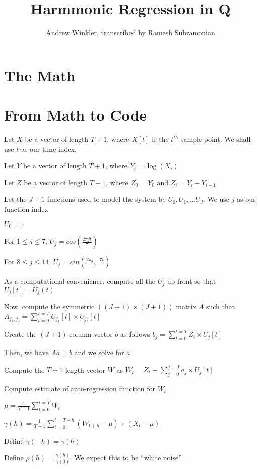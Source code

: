 \documentclass[12pt,timesnewroman,letterpaper]{article}
\begin{document}
\title{Harmmonic Regression in Q}
\author{Andrew Winkler, transcribed by Ramesh Subramonian }
\maketitle
\thispagestyle{fancy}
\cfoot{}
\rfoot{{\small \thepage}}

\section{The Math}
\TBC
\section{From Math to Code}
\bi
\item Let \(X\) be a vector of length \(T+1\), where \(X[t]\) is the \(t^{th}\)
sample point. We shall use \(t\) as our time index.
\item Let \(Y\) be a vector of length \(T+1\), where \(Y_i = \log(X_i)\)
\item Let \(Z\) be a vector of length \(T+1\), where 
\(Z_0 = Y_0\) and 
\(Z_i = Y_i - Y_{i-1}\)
\item 
Let the \(J+1\) functions used to model the system 
be \(U_0, U_1, \ldots U_J\). We use \(j\) as our
function index
\be
\item \(U_0 = 1\)
\item For \(1 \leq j \leq 7 \), \(U_j = cos(\frac{2 \pi j t}{7})\)
\item For \(8 \leq j \leq 14 \), \(U_j = sin(\frac{2 \pi {j-7} t}{7})\)
\ee
\item As a computational convenience, 
compute all the \(U_j\) up front so that \(U_j[t] = U_j(t)\)
\item Now, compute the symmetric \(((J+1) \times (J+1))\) matrix \(A\)
such that 
\(A_{j_1, j_2} = \sum_{t=0}^{t=T} U_{j_1}[t] \times U_{j_2}[t] \)
\item Create the \((J+1)\) column vector \(b\) as follows
\(b_j = \sum_{t=0}^{t=T} Z_t \times U_j[t]\)
\item Then, we have \(A a = b\) and we solve for \(a\)
\item Compute the \(T+1\) length vector \(W\) as 
\(W_t = Z_t - \sum_{j=0}^{j=J} a_j \times U_j[t]\) 
\item Compute estimate of auto-regression function for \(W_t\)
\item \(\mu = \frac{1}{T+1} \sum_{t=0}^{t=T} W_t\) 
\item \(\gamma(h) = \frac{1}{T+1} \sum_{t=0}^{t=T-h} 
(W_{t+h} - \mu) \times (X_t - \mu)\)
\item Define \(\gamma(-h) = \gamma(h)\)
\item Define \(\rho(h) = \frac{\gamma(h)}{\gamma(0)}\). We expect this to be
``white noise''
\ei
\end{document}
